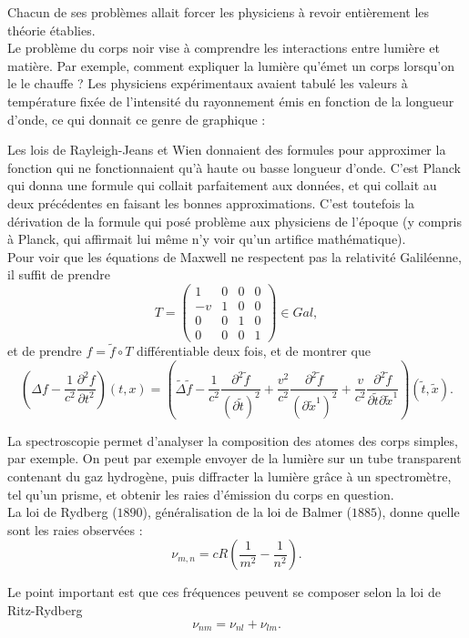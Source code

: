 Chacun de ses problèmes allait forcer les physiciens à revoir entièrement les théorie établies.\\

Le problème du corps noir vise à comprendre les interactions entre lumière et matière. Par exemple, comment expliquer la lumière qu'émet un corps lorsqu'on le le chauffe ? Les physiciens expérimentaux avaient tabulé les valeurs à température fixée de l'intensité du rayonnement émis en fonction de la longueur d'onde, ce qui donnait ce genre de graphique :

Les lois de Rayleigh-Jeans et Wien donnaient des formules pour approximer la fonction qui ne fonctionnaient qu'à haute ou basse longueur d'onde. C'est Planck qui donna une formule qui collait parfaitement aux données, et qui collait au deux précédentes en faisant les bonnes approximations. C'est toutefois la dérivation de la formule qui posé problème aux physiciens de l'époque (y compris à Planck, qui affirmait lui même n'y voir qu'un artifice mathématique).\\

Pour voir que les équations de Maxwell ne respectent pas la relativité Galiléenne, il suffit de prendre 
\[T=\begin{pmatrix}1 & 0 & 0& 0\\
-v &1 & 0& 0\\
0& 0& 1& 0\\
0& 0& 0& 1\end{pmatrix}\in Gal,\]
et de prendre $f=\tilde f\circ T$ différentiable deux fois, et de montrer que 
\[\left(\Delta f -\frac{1}{c^2}\frac{\partial^2 f}{\partial t^2}\right)(t,x) =
\left(\tilde\Delta \tilde f -\frac{1}{c^2}\frac{\partial^2 \tilde f}{(\partial \tilde t)^2}
+\frac{v^2}{c^2}\frac{\partial^2 \tilde f}{(\partial \tilde x^1)^2}+\frac{v}{c^2}\frac{\partial^2 \tilde f}{\partial \tilde t \partial \tilde x^1}\right)
(\tilde t , \tilde x ).\]

La spectroscopie permet d'analyser la composition des atomes des corps simples, par exemple. On peut par exemple envoyer de la lumière sur un tube transparent contenant du gaz hydrogène, puis diffracter la lumière grâce à un spectromètre, tel qu'un prisme, et obtenir les raies d'émission du corps en question.\\

La loi de Rydberg ($1890$), généralisation de la loi de Balmer ($1885$), donne quelle sont les raies observées :
\[\nu_{m,n}=cR(\frac{1}{m^2}-\frac{1}{n^2}).\]

Le point important est que ces fréquences peuvent se composer selon la loi de Ritz-Rydberg
\[\nu_{nm}=\nu_{nl}+\nu_{lm}.\]

